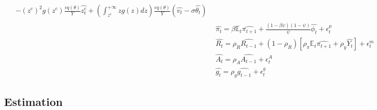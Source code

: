 \begin{align*}
\begin{split}
&- \left( z^c \right)^2 g\left( z^c \right) \frac{v q(\theta)}{Y} \widehat{z_t^c} + \left( \int_{z^c}^{+\infty} zg(z) dz \right) \frac{v q(\theta)}{Y} \left( \widehat{v_t} - \sigma \widehat{\theta_t} \right)
\end{split}\\
&\widehat{\pi_t} = \beta \mathbb{E}_t \widehat{\pi_{t+1}} + \frac{(1-\beta \psi) (1-\psi)}{\psi} \widehat{\phi_t}  + \epsilon_t^{\mu}\\
&\widehat{R_t} = \rho_R \widehat{R_{t-1}} + \left( 1 - \rho_R \right) \left[ \rho_{\pi} \mathbb{E}_t \widehat{\pi_{t+1}} + \rho_{y} \widehat{Y_t} \right] + \epsilon_t^m\\
&\widehat{A_t} = \rho_A \widehat{A_{t-1}} + \epsilon_t^A\\
&\widehat{g_t} = \rho_g \widehat{g_{t-1}} + \epsilon_t^g
\end{align*}

\subsection{Estimation}

